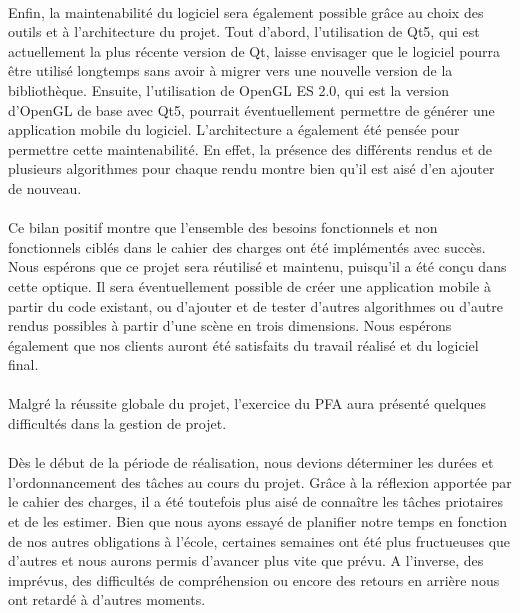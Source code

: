 \paragraph{}
Enfin, la maintenabilité du logiciel sera également possible grâce au choix des outils et à l'architecture du projet. 
Tout d'abord, l'utilisation de Qt5, qui est actuellement la plus récente version de Qt, laisse envisager que le logiciel pourra être utilisé longtemps sans avoir à migrer vers une nouvelle version de la bibliothèque. Ensuite, l'utilisation de OpenGL ES 2.0, qui est la version d'OpenGL de base avec Qt5, pourrait éventuellement permettre de générer une application mobile du logiciel. 
L'architecture a également été pensée pour permettre cette maintenabilité. En effet, la présence des différents rendus et de plusieurs algorithmes pour chaque rendu montre bien qu'il est aisé d'en ajouter de nouveau.

\paragraph{}
Ce bilan positif montre que l'ensemble des besoins fonctionnels et non fonctionnels ciblés dans le cahier des charges ont été implémentés avec succès. Nous espérons que ce projet sera réutilisé et maintenu, puisqu'il a été conçu dans cette optique. Il sera éventuellement possible de créer une application mobile à partir du code existant, ou d'ajouter et de tester d'autres algorithmes ou d'autre rendus possibles à partir d'une scène en trois dimensions. Nous espérons également que nos clients auront été satisfaits du travail réalisé et du logiciel final. 

\paragraph{}
Malgré la réussite globale du projet, l'exercice du PFA aura présenté quelques difficultés dans la gestion de projet.

\paragraph{}
Dès le début de la période de réalisation, nous devions déterminer les durées et l'ordonnancement des tâches au cours du projet. Grâce à la réflexion apportée par le cahier des charges, il a été toutefois plus aisé de connaître les tâches priotaires et de les estimer. Bien que nous ayons essayé de planifier notre temps en fonction de nos autres obligations à l'école, certaines semaines ont été plus fructueuses que d'autres et nous aurons permis d'avancer plus vite que prévu. A l'inverse, des imprévus, des difficultés de compréhension ou encore des retours en arrière nous ont retardé à d'autres moments.


